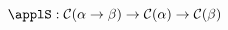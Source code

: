 \documentclass[preview]{standalone}
\begin{document}
\begin{equation*}
  \applS : \mathcal{C} (\alpha \rightarrow \beta) \rightarrow \mathcal{C}(\alpha) \rightarrow \mathcal{C}(\beta)
\end{equation*}
\end{document}
